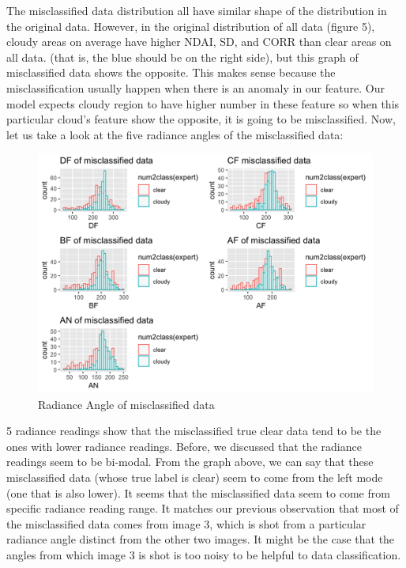 \documentclass[jou]{apa}%
\begin{document}
The misclassified data distribution all have similar shape of the distribution in the original data. However, in the original distribution of all data (figure 5), cloudy areas on average have higher NDAI, SD, and CORR than clear areas on all data. (that is, the blue should be on the right side), but this graph of misclassified data shows the opposite. This makes sense because the misclassification usually happen when there is an anomaly in our feature. Our model expects cloudy region to have higher number in these feature so when this particular cloud's feature show the opposite, it is going to be misclassified. Now, let us take a look at the five radiance angles of the misclassified data:
\begin{figure}[H]\centering\includegraphics[scale=0.2,]{radiancemis}\vspace*{-0.5cm}\caption{Radiance Angle of misclassified data}\end{figure}
5 radiance readings show that the misclassified true clear data tend to be the ones with lower radiance readings. Before, we discussed that the radiance readings seem to be bi-modal. From the graph above, we can say that these misclassified data (whose true label is clear) seem to come from the left mode (one that is also lower). It seems that the  misclassified data seem to come from specific radiance reading range. It matches our previous observation that most of the misclassified data comes from image 3, which is shot from a particular radiance angle distinct from the other two images. It might be the case that the angles from which image 3 is shot is too noisy to be helpful to data classification.\\
\end{document}
